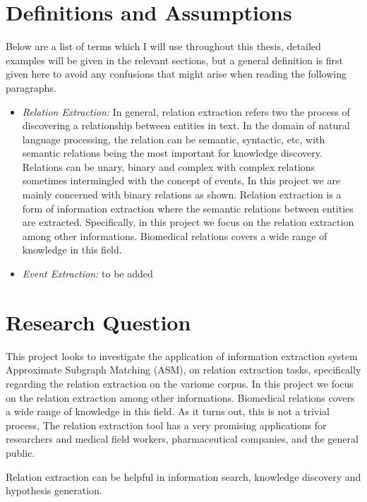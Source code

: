 \section{Definitions and Assumptions}
Below are a list of terms which I will use throughout this thesis, detailed examples will be given in the relevant sections, but a general definition is first given here to avoid any confusions that might arise when reading the following paragraphs.
\begin{itemize}
	\item \emph{Relation Extraction:} In general, relation extraction refers two the process of discovering a relationship between entities in text. In the domain of natural language processing, the relation can be semantic, syntactic, etc, with semantic relations being the most important for knowledge discovery. Relations can be unary, binary and complex with complex relations sometimes intermingled with the concept of events, In this project we are mainly concerned with binary relations as shown. Relation extraction is a form of information extraction where the semantic relations between entities are extracted.
	Specifically, in this project we focus on the relation extraction among other informations. Biomedical relations covers a wide range of knowledge in this field.
	\item \emph{Event Extraction:} to be added
\end{itemize}

\section{Research Question}\label{section1.2}%
This project looks to investigate the application of information extraction system Approximate Subgraph Matching (ASM)\cite{iu2013approximate},  on relation extraction tasks, specifically regarding the relation extraction on the variome corpus.
In this project we focus on the relation extraction among other informations. Biomedical relations covers a wide range of knowledge in this field. As it turns out, this is not a trivial process, The relation extraction tool has a very promising applications for researchers and medical field workers, pharmaceutical companies, and the general public. 

Relation extraction can be helpful in information search, knowledge discovery and hypothesis generation. 

